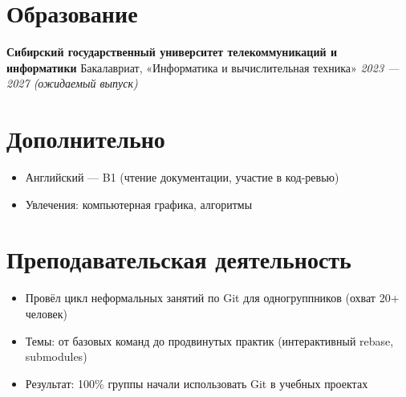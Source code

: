 \documentclass[a4paper,10pt]{article}
\begin{document}
\section*{Образование}
\textbf{Сибирский государственный университет телекоммуникаций и информатики}  
Бакалавриат, «Информатика и вычислительная техника»  
\textit{2023 — 2027 (ожидаемый выпуск)}

\section*{Дополнительно}
\begin{itemize}[noitemsep]
    \item Английский — B1 (чтение документации, участие в код-ревью)
    \item Увлечения: компьютерная графика, алгоритмы
\end{itemize}

\section*{Преподавательская деятельность}
\begin{itemize}[noitemsep]
    \item Провёл цикл неформальных занятий по Git для одногруппников (охват 20+ человек)
    \item Темы: от базовых команд до продвинутых практик (интерактивный rebase, submodules)
    \item Результат: 100\% группы начали использовать Git в учебных проектах
\end{itemize}
\end{document}
